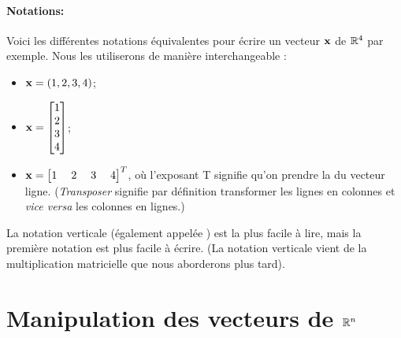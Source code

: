 \paragraph{\bf Notations:}  Voici les différentes notations équivalentes pour écrire un vecteur $\mathbf{x}$ de $\mathbb{R}^4$ par exemple. Nous les utiliserons de manière interchangeable :
\begin{itemize}
\item $\mathbf{x} = (1,2,3,4)$;
\item $\mathbf{x} = \left[ \begin{matrix} 1\\2\\3\\4 \end{matrix} \right]$;
\item $\mathbf{x} = \left[ \begin{matrix} 1\;&2\;&3\;&4 \end{matrix} \right]^T$, où l'exposant T signifie qu'on prendre la
 du vecteur ligne.  (\emph{Transposer} signifie par définition transformer les lignes en colonnes et \textit{vice versa} les colonnes en lignes.)
\end{itemize}
La notation verticale (également appelée ) est la plus facile à lire, mais la première notation est plus facile
à écrire.
(La notation verticale vient de la multiplication matricielle que nous aborderons plus tard).

\section{Manipulation des vecteurs de \texorpdfstring{$\mathbb{R}^n$}{Rn}}  

